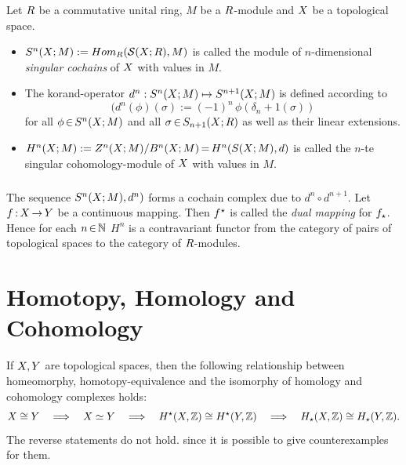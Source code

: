 \documentclass[11pt,twoside]{article}
\def\Rand#1{\delta_#1}
\def\modM{M}
\begin{document}
\begin{definition}
Let $R$ be a commutative unital ring, $\modM$ be a $R$-module and
$X$ be a topological space.

\begin{itemize}
\item
$S^n(\topX;\modM) := Hom_{\riR}(\cal{S}(\topX;\riR),\modM)$ is called the module
of $n$-dimensional \textit{singular cochains} of $X$
with values in $\modM$.
\item
The korand-operator $d^n : S^n(\topX;\modM) \mapsto S^{n+1}(\topX;\modM)$
is defined according to
\[
(d^n(\phi)(\sigma) := (-1)^n \, \phi(\Rand{n+1}(\sigma))
\]
for all $\phi \xeof S^n(\topX;\modM)$ and all $\sigma {\,\in\,} S_{n+1}(X;R)$
as well as their linear extensions.
\item
$H^n(\topX;\modM) := Z^n(\topX;\modM) / B^n(\topX;\modM) \eq H^n(S(\topX;\modM),d)$
is called the $n$-te singular cohomology-module of $X$ with values in $\modM$.
\end{itemize}
\end{definition}

\subparagraph{}
The sequence $S^n(\topX;\modM),d^n)$ forms a cochain complex
due to $d^n \circ d^{n+1}$.
Let $f {\,:\,} X {\,\to\,} Y$ be a continuous mapping.
Then $f^{\star}$ is called the \textit{dual mapping} for $f_{\star}$.
Hence for each $n {\,\in\,} {\mathbb{N}}$
$H^n$ is a contravariant functor from the category of pairs of topological spaces
to the category of $R$-modules.

\section{Homotopy, Homology and Cohomology}
If $X,Y$ are topological spaces,
then the following relationship between homeomorphy, homotopy-equivalence
and the isomorphy of homology and cohomology complexes holds:
\[
X \cong Y
\quad
\Longrightarrow
\quad
X \simeq Y
\quad
\Longrightarrow
\quad
H^{\star}(X,{\mathbb{Z}}) \cong H^{\star}(Y,{\mathbb{Z}})
\quad
\Longrightarrow
\quad
H_{\star}(X,{\mathbb{Z}}) \cong H_{\star}(Y,{\mathbb{Z}}).
\]
The reverse statements do not hold.
since it is possible to give counterexamples for them.

\end{document}
